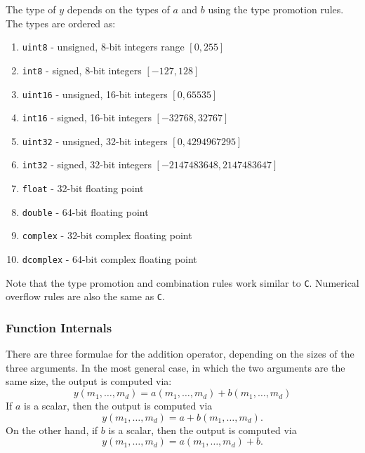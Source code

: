 The type of $y$ depends on the types of $a$ and $b$ using the type 
promotion rules.  The types are ordered as:
\begin{enumerate}
\item \verb|uint8| - unsigned, 8-bit integers range $[0,255]$
\item \verb|int8| - signed, 8-bit integers $[-127,128]$
\item \verb|uint16| - unsigned, 16-bit integers $[0,65535]$
\item \verb|int16| - signed, 16-bit integers $[-32768,32767]$
\item \verb|uint32| - unsigned, 32-bit integers $[0,4294967295]$
\item \verb|int32| - signed, 32-bit integers $[-2147483648,2147483647]$
\item \verb|float| - 32-bit floating point
\item \verb|double| - 64-bit floating point
\item \verb|complex| - 32-bit complex floating point
\item \verb|dcomplex| - 64-bit complex floating point
\end{enumerate}
Note that the type promotion and combination rules work similar to 
\verb|C|.  Numerical overflow rules are also the same as \verb|C|.
\subsubsection{Function Internals}
There are three formulae for the addition operator, depending on the
sizes of the three arguments.  In the most general case, in which 
the two arguments are the same size, the output is computed via:
\[
y(m_1,\ldots,m_d) = a(m_1,\ldots,m_d) + b(m_1,\ldots,m_d)
\]
If $a$ is a scalar, then the output is computed via
\[
y(m_1,\ldots,m_d) = a + b(m_1,\ldots,m_d).
\]
On the other hand, if $b$ is a scalar, then the output is computed via
\[
y(m_1,\ldots,m_d) = a(m_1,\ldots,m_d) + b.
\]
